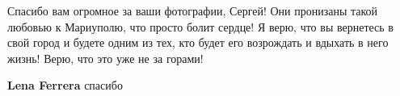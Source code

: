  
 
 
 
 

\qqSecCmt


Спасибо вам огромное за ваши фотографии, Сергей! Они пронизаны такой любовью к
Мариуполю, что просто болит сердце! Я верю, что вы вернетесь в свой город и
будете одним из тех, кто будет его возрождать и вдыхать в него жизнь! Верю, что
это уже не за горами!

\textbf{Lena Ferrera} спасибо
